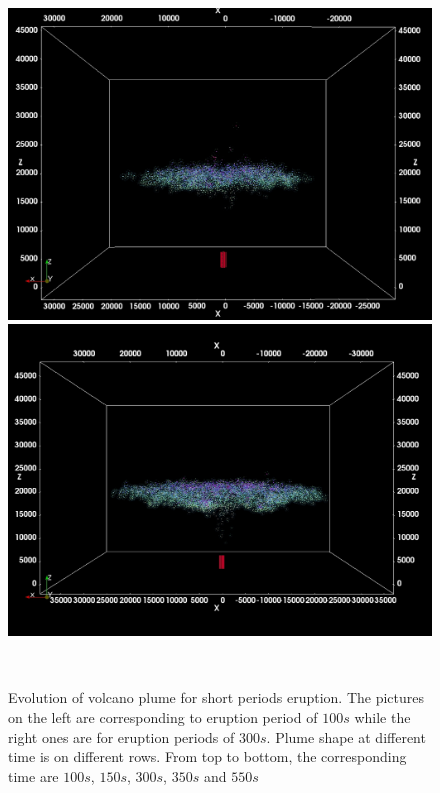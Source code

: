 \begin{figure}
\begin{minipage}{.33\textwidth}
        \includegraphics[width=0.99 \textwidth]{Chapter-6/Figures/ShortErupt/Erupt100_t550}
    \end{minipage}%
    \begin{minipage}{.33 \textwidth}
        \centering
        \includegraphics[width=0.99 \textwidth]{Chapter-6/Figures/ShortErupt/Erupt300_t550}
    \end{minipage}%
    \\
    \caption{Evolution of volcano plume for short periods eruption. The pictures on the left are corresponding to eruption period of $100s$ while the right ones are for eruption periods of $300s$. Plume shape at different time is on different rows. From top to bottom, the corresponding time are $100s$, $150s$, $300s$, $350s$ and $550s$} 
    \label{fig:pinatubo-short-erupt-evolution}
\end{figure}

